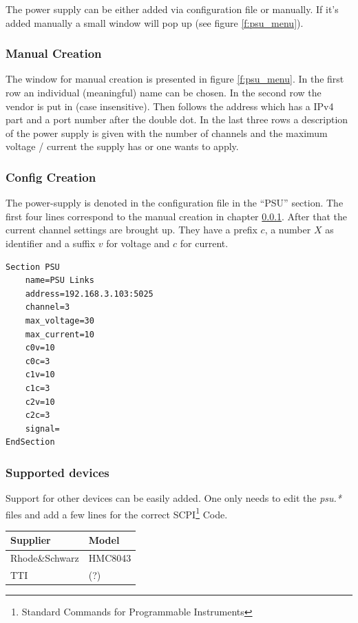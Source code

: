 \documentclass[10pt,a4paper]{article}
\begin{document}
	The power supply can be either added via configuration file or manually. If it's added manually a small window will pop up (see figure \ref{f:psu_menu}). 
	
	\subsubsection{Manual Creation}	
	\label{c:psu_manual_creation}
	
	The window for manual creation is presented in figure \ref{f:psu_menu}. In the first row an individual (meaningful) name can be chosen. In the second row the vendor is put in (case insensitive). Then follows the address which has a IPv4 part and a port number after the double dot. In the last three rows a description of the power supply is given with the number of channels and the maximum voltage / current the supply has or one wants to apply.	
	
	\subsubsection{Config Creation}
	
	The power-supply is denoted in the configuration file in the \enquote{PSU} section. The first four lines correspond to the manual creation in chapter \ref{c:psu_manual_creation}. After that the current channel settings are brought up. They have a prefix $c$, a number $X$ as identifier and a suffix $v$ for voltage and $c$ for current.
	
\begin{lstlisting}
Section PSU
	name=PSU Links
	address=192.168.3.103:5025
	channel=3
	max_voltage=30
	max_current=10
	c0v=10
	c0c=3
	c1v=10
	c1c=3
	c2v=10
	c2c=3
	signal=
EndSection
\end{lstlisting}
	
		\subsubsection{Supported devices}
		Support for other devices can be easily added. One only needs to edit the \textit{psu.*} files and add a few lines for the correct SCPI\footnote{Standard Commands for Programmable Instruments} Code.
	
		\begin{table}[H]
		\centering
		\begin{tabular}{ll}
		\toprule
		Supplier			& Model \\ \midrule
		Rhode\&Schwarz		& HMC8043 \\
		TTI					& (?) \\
		\bottomrule
		\end{tabular}			
		\end{table}	
	
\end{document}
